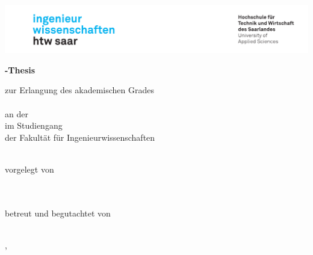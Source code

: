 \begin{titlepage}\linespread{1.5}\selectfont
\includegraphics[width=\linewidth]{Graphics/htwsaar_Logo_inwi_head_VF_4C_crop}
  \begin{center}
    \large  
    \hfill
    \vfill
    \begingroup
      \Large\bfseries\myDegreeType-Thesis 
    \endgroup
		
		\bigskip
		
    zur Erlangung des akademischen Grades \\
    \myDegree \\ 
    an der \myUni \\
    im Studiengang \myDegreeCourse \\
    der Fakultät für Ingenieurwissenschaften \\ 
    
  \vfill
	
  \begingroup
    \Large\bfseries\myTitle 
  \endgroup
	
	\bigskip
	
  vorgelegt von \\
  \myName \\
  \mysecondName\\
  \mythirdName
	
	
  \vfill
	
  betreut und begutachtet von \\
  \myFirstProf \\
  
  \vfill
	
  \myLocation, \myTime                   

    \end{center}       
\end{titlepage}   